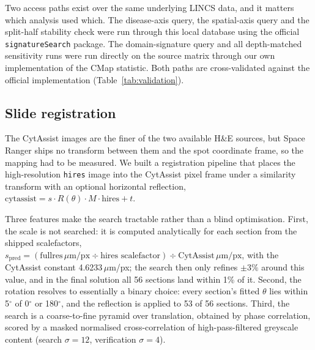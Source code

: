 Two access paths exist over the same underlying LINCS data, and it matters which analysis
used which. The disease-axis query, the spatial-axis query and the split-half stability
check were run through this local database using the official \texttt{signatureSearch}
package. The domain-signature query and all depth-matched sensitivity runs were run
directly on the source matrix through our own implementation of the CMap statistic. Both
paths are cross-validated against the official implementation (Table~\ref{tab:validation}).

\subsection{Slide registration}

The CytAssist images are the finer of the two available H\&E sources, but Space Ranger ships
no transform between them and the spot coordinate frame, so the mapping had to be measured.
We built a registration pipeline that places the high-resolution \texttt{hires} image into
the CytAssist pixel frame under a similarity transform with an optional horizontal
reflection,
$\text{cytassist} = s \cdot R(\theta) \cdot M \cdot \text{hires} + t$.

Three features make the search tractable rather than a blind optimisation. First, the scale
is not searched: it is computed analytically for each section from the shipped
scalefactors, $s_{\text{pred}} = (\text{fullres}\,\mu\text{m/px} \div \text{hires
scalefactor}) \div \text{CytAssist}\,\mu\text{m/px}$, with the CytAssist constant
4.6233\,$\mu$m/px; the search then only refines $\pm3\%$ around this value, and in the
final solution all 56 sections land within 1\% of it. Second, the rotation resolves to
essentially a binary choice: every section's fitted $\theta$ lies within 5$^\circ$ of
0$^\circ$ or 180$^\circ$, and the reflection is applied to 53 of 56 sections. Third, the
search is a coarse-to-fine pyramid over translation, obtained by phase correlation, scored
by a masked normalised cross-correlation of high-pass-filtered greyscale content (search
$\sigma = 12$, verification $\sigma = 4$).


